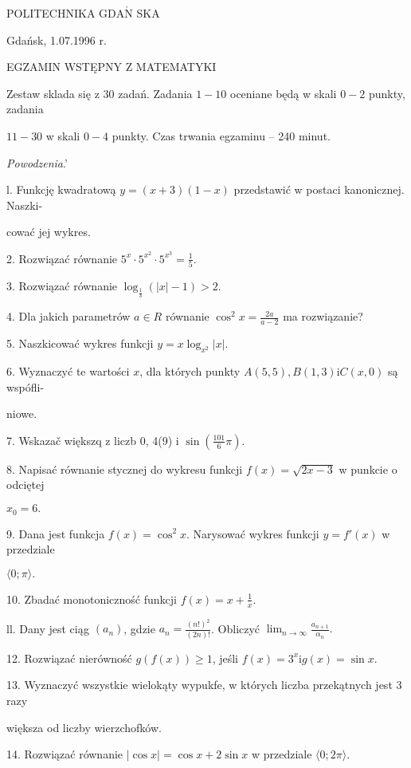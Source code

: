 \documentclass[a4paper,12pt]{article}
\begin{document}
POLITECHNIKA $\mathrm{G}\mathrm{D}\mathrm{A}\acute{\mathrm{N}}$ SKA

Gdańsk, 1.07.1996 r.

EGZAMIN WSTĘPNY Z MATEMATYKI

Zestaw sklada się z 30 zadań. Zadania $1-10$ oceniane będą w skali $0-2$ punkty, zadania

$11-30$ w skali $0-4$ punkty. Czas trwania egzaminu -- 240 minut.

{\it Powodzenia}.'

l. Funkcję kwadratową $y=(x+3)(1-x)$ przedstawić w postaci kanonicznej. Naszki-

cować jej wykres.

2. Rozwiązać równanie $5^{x}\displaystyle \cdot 5^{x^{2}}\cdot 5^{x^{3}}=\frac{1}{5}.$

3. Rozwiązać równanie $\log_{\frac{1}{3}}(|x|-1)>2.$

4. Dla jakich parametrów $a\in R$ równanie $\displaystyle \cos^{2}x=\frac{2a}{a-2}$ ma rozwiązanie?

5. Naszkicować wykres funkcji $y=x\log_{x^{2}}|x|.$

6. Wyznaczyć te wartości $x$, dla których punkty $A(5,5), B(1,3)\mathrm{i}C(x,0)$ są wspófli-

niowe.

7. Wskazač większq z liczb 0, 4(9) i $\displaystyle \sin(\frac{101}{6}\pi).$

8. Napisać równanie stycznej do wykresu funkcji $f(x)=\sqrt{2x-3}$ w punkcie o odciętej

$x_{0}=6.$

9. Dana jest funkcja $f(x)=\cos^{2}x$. Narysować wykres funkcji $y=f'(x)$ w przedziale

$\langle 0;\pi\rangle.$

10. Zbadać monotoniczność funkcji $f(x)=x+\displaystyle \frac{1}{x}.$

ll. Dany jest ciąg $(a_{n})$, gdzie $a_{n}=\displaystyle \frac{(n!)^{2}}{(2n)!}$. Obliczyć $\displaystyle \lim_{n\rightarrow\infty}\frac{a_{n+1}}{\alpha_{n}}.$

12. Rozwiązać nierówność $g(f(x))\geq 1$, jeśli $f(x)=3^{x}\mathrm{i}g(x)=\sin x.$

13. Wyznaczyć wszystkie wielokąty wypukfe, w których liczba przekątnych jest 3 razy

większa od liczby wierzchofków.

14. Rozwiązać równanie $|\cos x|=\cos x+2\sin x$ w przedziale $\langle 0;2\pi\rangle.$
\end{document}
